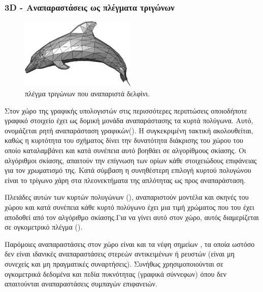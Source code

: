     \subsubsection{3D - Αναπαραστάσεις ως πλέγματα τριγώνων}
    \begin{figure}[!tbh]
    \centering
    \includegraphics[width=5.5cm]{images/chapter2_img/Dolphin_triangle_mesh.jpg}
    \caption{ πλέγμα τριγώνων που αναπαριστά δελφίνι.}
    \label{fig:1}
    \end{figure} 
\par 
    Στον χώρο της γραφικής υπολογιστών στις περισσότερες περιπτώσεις οποιοδήποτε γραφικό στοιχείο έχει ως δομική μονάδα αναπαράστασης τα κυρτά πολύγωνα. Αυτό, ονομάζεται ρητή αναπαράσταση γραφικών(). Η συγκεκριμένη τακτική ακολουθείται, καθώς η κυρτότητα του σχήματος δίνει την δυνατότητα διάκρισης του χώρου του οποίο καταλαμβάνει και κατά συνέπεια αυτό βοηθάει σε αλγορίθμους σκίασης. Οι αλγόριθμοι σκίασης, απαιτούν την επίγνωση των ορίων κάθε στοιχειώδους επιφάνειας για τον χρωματισμό της. Κατά σύμβαση η συνηθέστερη επιλογή κυρτού πολυγώνου είναι το τρίγωνο χάρη στα πλεονεκτήματα της απλότητας ως προς αναπαράσταση.
\par 
    Πλειάδες αυτών των κυρτών πολυγώνων (), αναπαριστούν  μοντέλα και σκηνές του χώρου και κατά συνέπεια κάθε κυρτό πολύγωνο έχει μια τιμή χρώματος που του έχει αποδοθεί από τον αλγόριθμο σκίασης.Για να γίνει αυτό στον  χώρο, αυτός διαμερίζεται σε ογκομετρικό πλέγμα ().
\par 
    Παρόμοιες αναπαραστάσεις στον  χώρο είναι και τα νέφη σημείων , τα οποία ωστόσο δεν είναι ιδανικές αναπαραστάσεις στερεών αντικειμένων ή ρευστών (είναι μη συνεχείς και μη πραγματικές συναρτήσεις). Συνήθως χρησιμοποιούνται σε ογκομετρικά δεδομένα και πεδία πυκνότητας (γραφικά σύννεφων) όπου δεν απαιτούνται αναπαραστάσεις συμπαγών επιφανειών.   
\par

